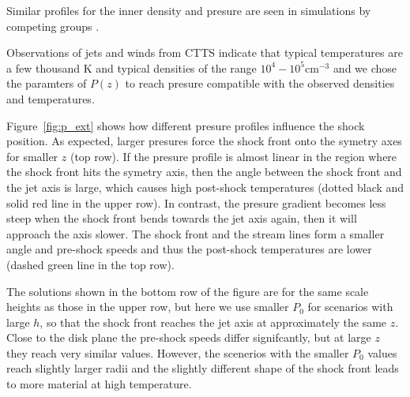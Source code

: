 Similar profiles for the inner density and presure are seen in simulations by competing groups \citep[e.g.]{2005ApJ...630..945A,Li_Krasnopolsky_Blandford_2006,2008ApJ...678.1109M}.

Observations of jets and winds from CTTS indicate that typical temperatures are a few thousand K and typical densities of the range $10^4-10^5 \mathrm{ cm}^{-3}$ \citep[e.g.][]{2000A&amp;A...356L..41L,2007ApJ...657..897K} and we chose the paramters of $P(z)$ to reach presure compatible with the observed densities and temperatures.

Figure~\ref{fig:p_ext} shows how different presure profiles influence the shock position. As expected, larger presures force the shock front onto the symetry axes for smaller $z$ (top row). If the presure profile is almost linear in the region where the shock front hits the symetry axis, then the angle between the shock front and the jet axis is large, which causes high post-shock temperatures (dotted black and solid red line in the upper row). In contrast, the presure gradient becomes less steep when the shock front bends towards the jet axis again, then it will approach the axis slower. The shock front and the stream lines form a smaller angle and pre-shock speeds and thus the post-shock temperatures are lower (dashed green line in the top row).

The solutions shown in the bottom row of the figure are for the same scale heights as those in the upper row, but here we use smaller $P_0$ for scenarios with large $h$, so that the shock front reaches the jet axis at approximately the same $z$. Close to the disk plane the pre-shock speeds differ signifcantly, but at large $z$ they reach very similar values. However, the scenerios with the smaller $P_0$ values reach slightly larger radii and the slightly different shape of the shock front leads to more material at high temperature.
